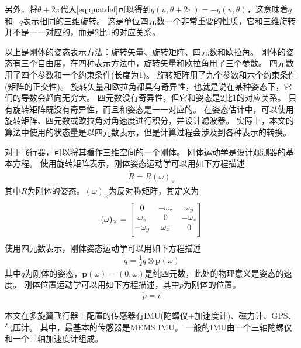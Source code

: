 \documentclass[
  type=master
]{gdutthesis}
\begin{document}
另外，将$\theta + 2\pi$代入\autoref{eq:quatdef}可以得到$q(u,\theta + 2\pi)=-q(u,\theta)$，这意味着$q$和$-q$表示相同的三维旋转。
这是单位四元数一个非常重要的性质，它和三维旋转并不是一一对应的，而是2比1的对应关系。

以上是刚体的姿态表示方法：旋转矢量、旋转矩阵、四元数和欧拉角。
刚体的姿态有三个自由度，在四种表示方法中，旋转矢量和欧拉角用了三个参数。
四元数用了四个参数和一个约束条件(长度为1)。
旋转矩阵用了九个参数和六个约束条件(矩阵的正交性)。
旋转矢量和欧拉角都具有奇异性，也就是说在某种姿态下，它们的导数会趋向无穷大。
四元数没有奇异性，但它和姿态是2比1的对应关系。
只有旋转矩阵既没有奇异性，而且和姿态是一一对应的。
在姿态估计中，可以使用旋转矩阵、四元数或欧拉角对角速度进行积分，并设计滤波器。
实际上，本文的算法中使用的状态量是以四元数表示，但是计算过程会涉及到各种表示的转换。

对于飞行器，可以将其看作三维空间的一个刚体。
刚体运动学是设计观测器的基本方程。
使用旋转矩阵表示，刚体姿态运动学可以用如下方程描述
\begin{gather}\label{eq:matrixkinematics}
	\dot{R}=R (\omega)_{\times}
\end{gather}
其中$R$为刚体的姿态。$(\omega)_{\times}$为反对称矩阵，其定义为
\begin{gather}\label{eq:matrixkinematics}
	(\omega)_{\times}=
	\begin{bmatrix}
		0 & -\omega_z & \omega_y\\
		\omega_z & 0 & -\omega_x\\
		-\omega_y & \omega_x & 0\vspace{1ex}
	\end{bmatrix}
\end{gather}
\vspace{1ex}使用四元数表示，刚体姿态运动学可以用如下方程描述
\begin{gather}\label{eq:quatkinematics}
	\dot{q}=\frac{1}{2} q \otimes \mathbf{p}(\omega)
\end{gather}
其中$q$为刚体的姿态，$\mathbf{p}(\omega)=(0,\omega)$是纯四元数，此处的物理意义是姿态的速度。
刚体位置运动学可以用如下方程描述，其中$p$为刚体的位置。
\begin{gather}\label{eq:matrixkinematics}
	\dot{p}=v
\end{gather}

本文在多旋翼飞行器上配置的传感器有IMU(陀螺仪+加速度计)、磁力计、GPS、气压计。
其中，最基本的传感器是MEMS IMU。
一般的IMU由一个三轴陀螺仪和一个三轴加速度计组成。
\end{document}

